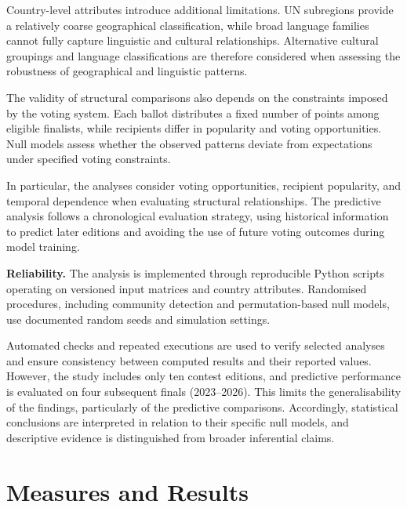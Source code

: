 \documentclass[12pt,a4paper]{article}
\begin{document}
Country-level attributes introduce additional
limitations. UN subregions provide a relatively
coarse geographical classification, while broad
language families cannot fully capture linguistic
and cultural relationships. Alternative cultural
groupings and language classifications are
therefore considered when assessing the robustness
of geographical and linguistic patterns.

The validity of structural comparisons also depends
on the constraints imposed by the voting system.
Each ballot distributes a fixed number of points
among eligible finalists, while recipients differ
in popularity and voting opportunities.
Null models assess whether the observed patterns
deviate from expectations under specified voting
constraints.

In particular, the analyses consider voting
opportunities, recipient popularity, and temporal
dependence when evaluating structural relationships.
The predictive analysis follows a chronological
evaluation strategy, using historical information
to predict later editions and avoiding the use
of future voting outcomes during model training.

\medskip

\textbf{Reliability.}
The analysis is implemented through reproducible
Python scripts operating on versioned input
matrices and country attributes. Randomised
procedures, including community detection and
permutation-based null models, use documented
random seeds and simulation settings.

Automated checks and repeated executions are
used to verify selected analyses and ensure
consistency between computed results and their
reported values. However, the study includes only ten contest
editions, and predictive performance is
evaluated on four subsequent finals
(2023--2026). This limits the generalisability of the findings,
particularly of the predictive comparisons.
Accordingly, statistical conclusions are
interpreted in relation to their specific null
models, and descriptive evidence is distinguished
from broader inferential claims.




\section{Measures and Results}
\label{measures}
\end{document}
